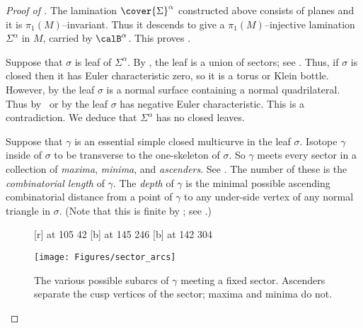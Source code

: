 \documentclass[12pt]{amsart}
\begin{document}
\begin{proof}[Proof of ]
The lamination $\cover{\Sigma}^\alpha$ constructed above consists of planes and it is $\pi_1(M)$--invariant.  Thus it descends to give a $\pi_1(M)$--injective lamination $\Sigma^\alpha$ in $M$, carried by $\calB^\alpha$.  This proves .

Suppose that $\sigma$ is leaf of $\Sigma^\alpha$. By , the leaf is a union of sectors; see .
Thus, if $\sigma$ is closed then it has Euler characteristic zero, so it is a torus or Klein bottle. 
However, by  the leaf $\sigma$ is a normal surface containing a normal quadrilateral.  Thus by~\cite[Theorem~1.5]{HRST11} or by \cite[Theorem~1.4]{FuterGueritaud13} the leaf $\sigma$ has negative Euler characteristic.  This is a contradiction.  We deduce that $\Sigma^\alpha$ has no closed leaves.

Suppose that $\gamma$ is an essential simple closed multicurve in the leaf $\sigma$.  Isotope $\gamma$ inside of $\sigma$ to be transverse to the one-skeleton of $\sigma$.  So $\gamma$ meets every sector in a collection of  \emph{maxima}, \emph{minima}, and \emph{ascenders}.  See .  The number of these is the \emph{combinatorial length} of $\gamma$.  The \emph{depth} of $\gamma$ is the minimal possible ascending combinatorial distance from a point of $\gamma$ to any under-side vertex of any normal triangle in $\sigma$.  (Note that this is finite by ; see .)

\begin{figure}[htb]
\centering
{}
\small\hair 2pt
 [r] at 105 42
 [b] at 145 246
 [b] at 142 304

\endlabellist
\texttt{[image: Figures/sector\_arcs]}
\caption{The various possible subarcs of $\gamma$ meeting a fixed sector.  Ascenders separate the cusp vertices of the sector; maxima and minima do not.}
\label{Fig:SectorArcs}
\end{figure}


\end{proof}
\end{document}
